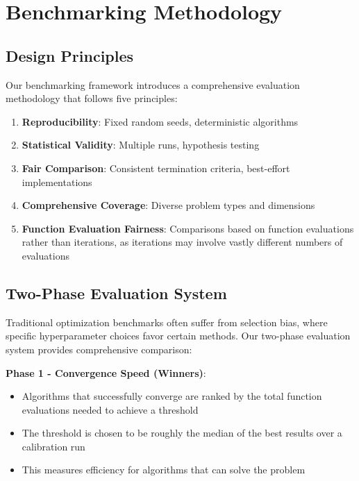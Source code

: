 \hypertarget{benchmarking-methodology}{%
\section{Benchmarking Methodology}\label{benchmarking-methodology}}

\hypertarget{design-principles}{%
\subsection{Design Principles}\label{design-principles}}

Our benchmarking framework introduces a comprehensive evaluation methodology that follows five principles:

\begin{enumerate}
\def\labelenumi{\arabic{enumi}.}
\tightlist
\item
  \textbf{Reproducibility}: Fixed random seeds, deterministic algorithms
\item
  \textbf{Statistical Validity}: Multiple runs, hypothesis testing
\item
  \textbf{Fair Comparison}: Consistent termination criteria, best-effort implementations
\item
  \textbf{Comprehensive Coverage}: Diverse problem types and dimensions
\item
  \textbf{Function Evaluation Fairness}: Comparisons based on function evaluations rather than iterations, as iterations may involve vastly different numbers of evaluations
\end{enumerate}

\hypertarget{two-phase-evaluation-system}{%
\subsection{Two-Phase Evaluation System}\label{two-phase-evaluation-system}}

Traditional optimization benchmarks often suffer from selection bias, where specific hyperparameter choices favor certain methods. Our two-phase evaluation system provides comprehensive comparison:

\textbf{Phase 1 - Convergence Speed (Winners)}:

\begin{itemize}
\tightlist
\item
  Algorithms that successfully converge are ranked by the total function evaluations needed to achieve a threshold
\item
  The threshold is chosen to be roughly the median of the best results over a calibration run
\item
  This measures efficiency for algorithms that can solve the problem
\end{itemize}

